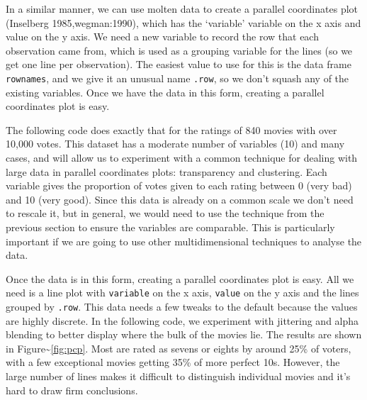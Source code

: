 In a similar manner, we can use molten data to create a parallel
coordinates plot (Inselberg 1985,wegman:1990), which has the `variable'
variable on the x axis and value on the y axis. We need a new variable
to record the row that each observation came from, which is used as a
grouping variable for the lines (so we get one line per observation).
The easiest value to use for this is the data frame \texttt{rownames},
and we give it an unusual name \texttt{.row}, so we don't squash any of
the existing variables. Once we have the data in this form, creating a
parallel coordinates plot is easy. 

The following code does exactly that for the ratings of 840 movies with
over 10,000 votes. This dataset has a moderate number of variables (10)
and many cases, and will allow us to experiment with a common technique
for dealing with large data in parallel coordinates plots: transparency
and clustering. Each variable gives the proportion of votes given to
each rating between 0 (very bad) and 10 (very good). Since this data is
already on a common scale we don't need to rescale it, but in general,
we would need to use the technique from the previous section to ensure
the variables are comparable. This is particularly important if we are
going to use other multidimensional techniques to analyse the data.

\begin{Shaded}
\begin{Highlighting}[]
\StringTok{ }\StringTok{ }\NormalTok{)}
\StringTok{ }\NormalTok{popular[, }\NormalTok{:}\NormalTok{]}
\StringTok{ }
\StringTok{ }
\end{Highlighting}
\end{Shaded}

Once the data is in this form, creating a parallel coordinates plot is
easy. All we need is a line plot with \texttt{variable} on the x axis,
\texttt{value} on the y axis and the lines grouped by \texttt{.row}.
This data needs a few tweaks to the default because the values are
highly discrete. In the following code, we experiment with jittering and
alpha blending to better display where the bulk of the movies lie. The
results are shown in Figure\textasciitilde{}\ref{fig:pcp}. Most are
rated as sevens or eights by around 25\% of voters, with a few
exceptional movies getting 35\% of more perfect 10s. However, the large
number of lines makes it difficult to distinguish individual movies and
it's hard to draw firm conclusions. 

